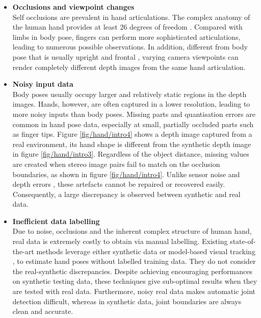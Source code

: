 \begin{itemize} 

\item{\textbf{Occlusions and viewpoint changes}} \\  
Self occlusions are prevalent in hand articulations. The complex anatomy of the human hand provides at least 26 degrees of freedom \cite{Rehg1995, Holden1995}. Compared with limbs in body pose, fingers can perform more sophisticated articulations, leading to numerous possible observations. In addition, different from body pose that is usually upright and frontal \cite{Eichner2012}, varying camera viewpoints can render completely different depth images from the same hand articulation. 

\item{\textbf{Noisy input data}} \\ 
Body poses usually occupy larger and relatively static regions in the depth images. 
Hands, however, are often captured in a lower resolution, leading to more noisy inputs than body poses. 
Missing parts and quantisation errors are common in hand pose data, especially at small, partially occluded parts such as finger tips. Figure \ref{fig/hand/intro4} shows a depth image captured from a real environment, its hand shape is different from the synthetic depth image in figure \ref{fig/hand/intro3}.   
Regardless of the object distance, missing values are created when stereo image pairs fail to match on the occlusion boundaries, as shown in figure \ref{fig/hand/intro4}. 
Unlike sensor noise and depth errors \cite{Girshick2011, Baak2011}, these artefacts cannot be repaired or recovered easily. Consequently, a large discrepancy is observed between synthetic and real data.  

\item{\textbf{Inefficient data labelling}} \\ 
Due to noise, occlusions and the inherent complex structure of human hand, real data is extremely costly to obtain via manual labelling. 
Existing state-of-the-art methods leverage either synthetic data \cite{Keskin2012} or model-based visual tracking \cite{LaGorce2011, Oikonomidis2012}, to estimate hand poses without labelled training data. 
They do not consider the real-synthetic discrepancies. 
Despite achieving encouraging performances on synthetic testing data, these techniques give sub-optimal results when they are tested with real data. 
Furthermore, noisy real data makes automatic joint detection difficult, whereas in synthetic data, joint boundaries are always clean and accurate.
\end{itemize} 

